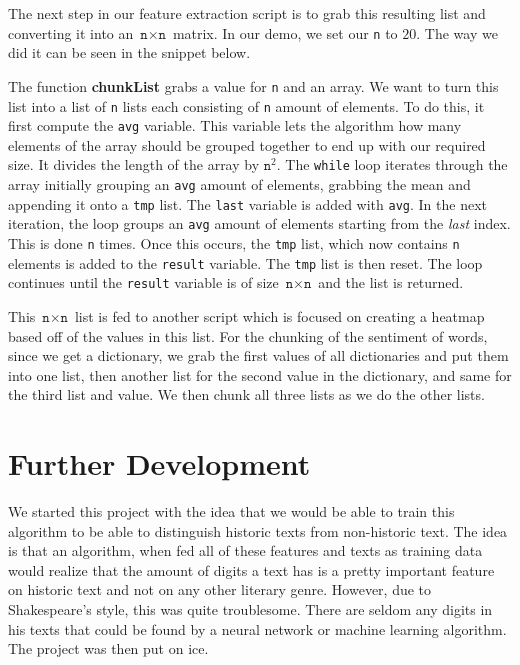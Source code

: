 \documentclass[runningheads]{llncs}
\begin{document}
The next step in our feature extraction script is to grab this resulting list and converting it into an $\texttt{n} \times \texttt{n}$ matrix. In our demo, we set our \texttt{n} to $20$. The way we did it can be seen in the snippet below.

%

The function \textbf{chunkList} grabs a value for \texttt{n} and an array. We want to turn this list into a list of \texttt{n} lists each consisting of \texttt{n} amount of elements. To do this, it first compute the \texttt{avg} variable. This variable lets the algorithm how many elements of the array should be grouped together to end up with our required size. It divides the length of the array by $\texttt{n}^2$. The \texttt{while} loop iterates through the array initially grouping an \texttt{avg} amount of elements, grabbing the mean and appending it onto a \texttt{tmp} list. The \texttt{last} variable is added with \texttt{avg}. In the next iteration, the loop groups an \texttt{avg} amount of elements starting from the \textit{last} index. This is done \texttt{n} times. Once this occurs, the \texttt{tmp} list, which now contains \texttt{n} elements is added to the \texttt{result} variable. The \texttt{tmp} list is then reset. The loop continues until the \texttt{result} variable is of size $\texttt{n} \times \texttt{n}$ and the list is returned. 

This $\texttt{n} \times \texttt{n}$ list is fed to another script which is focused on creating a heatmap based off of the values in this list. For the chunking of the sentiment of words, since we get a dictionary, we grab the first values of all dictionaries and put them into one list, then another list for the second value in the dictionary, and same for the third list and value. We then chunk all three lists as we do the other lists. 


\section{Further Development}

We started this project with the idea that we would be able to train this algorithm to be able to distinguish historic texts from non-historic text. The idea is that an algorithm, when fed all of these features and texts as training data would realize that the amount of digits a text has is a pretty important feature on historic text and not on any other literary genre. However, due to Shakespeare's style, this was quite troublesome. There are seldom any digits in his texts that could be found by a neural network or machine learning algorithm. The project was then put on ice. 
\end{document}

